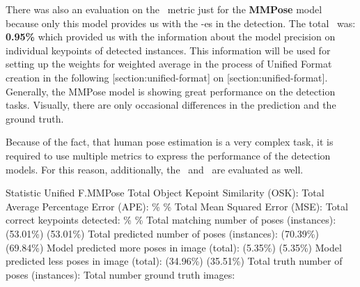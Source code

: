 
There was also an evaluation on the \APE\ metric just for the {\bf MMPose} model because only this model provides us with the \BBOX\--es in the detection. The total \APE\ was: {\bf 0.95\%} which provided us with the information about the model precision on individual keypoints of detected instances. This information will be used for setting up the weights for weighted average in the process of Unified Format creation in the following [section:unified-format] on [section:unified-format]. Generally, the MMPose model is showing great performance on the detection tasks. Visually, there are only occasional differences in the prediction and the ground truth.

Because of the fact, that human pose estimation is a very complex task, it is required to use multiple metrics to express the performance of the detection models. For this reason, additionally, the \MSE\ and \OKS\ are evaluated as well.

    \setupTABLE[r][1][style=bold]
    \setupTABLE[c][each][offset=3dd]
    \setupTABLE[frame=off]
    \setupTABLE[r][1][topframe=on,bottomframe=on]
    \setupTABLE[c][each][leftframe=on]
    \setupTABLE[c][1][leftframe=off]
    \setupTABLE[c][2,3][align=middle]
    \bTR\bTD Statistic                                   \eTD\bTD    Unified F.\eTD\bTD       MMPose\eTD\eTR
    \bTR\bTD Total Object Kepoint Similarity (OSK):      \eTD{} \eTD{} \eTD\eTR
    \bTR\bTD Total Average Percentage Error (APE):       \eTD{}\% \eTD{}\% \eTD\eTR
    \bTR\bTD Total Mean Squared Error (MSE):             \eTD{} \eTD{} \eTD\eTR
    \bTR\bTD Total correct keypoints detected:           \eTD{}\% \eTD{}\% \eTD\eTR
    \bTR\bTD Total matching number of poses (instances): \eTD{} (53.01\%) \eTD{} (53.01\%) \eTD\eTR
    \bTR\bTD Total predicted number of poses (instances):\eTD{} (70.39\%) \eTD{} (69.84\%) \eTD\eTR
    \bTR\bTD Model predicted more poses in image (total):\eTD{} (5.35\%)\eTD{} (5.35\%) \eTD\eTR
    \bTR\bTD Model predicted less poses in image (total):\eTD{} (34.96\%)\eTD{} (35.51\%) \eTD\eTR
    \bTR\bTD Total truth number of poses (instances):    \eTD{} \eTD{} \eTD\eTR
    \bTR\bTD Total number ground truth images:           \eTD{} \eTD{} \eTD\eTR

